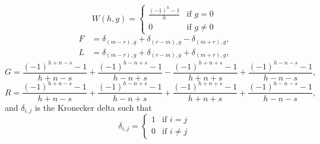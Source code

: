 \begin{equation*}
  W(h,g) = \begin{cases} \frac{\left( -1 \right)^h -1}{h} &\text{if } g = 0 \\
    0& \text{if } g\ne 0
  \end{cases}
\end{equation*}
\begin{align*}
  F &= \delta_{(m-r),g} + \delta_{(r-m),g} - \delta_{(m+r),g}, \\
  L &= \delta_{(m-r),g} + \delta_{(r-m),g} + \delta_{(m+r),g},
\end{align*}
\begin{equation*}
  G = \frac{\left( -1 \right)^{h+n-s}-1}{h+n-s} 
    + \frac{\left( -1 \right)^{h-n+s}-1}{h-n+s}
    - \frac{\left( -1 \right)^{h+n+s}-1}{h+n+s}
    + \frac{\left( -1 \right)^{h-n-s}-1}{h-n-s},
\end{equation*}
\begin{equation*}
  R = \frac{\left( -1 \right)^{h+n-s}-1}{h+n-s} 
    + \frac{\left( -1 \right)^{h-n+s}-1}{h-n+s}
    + \frac{\left( -1 \right)^{h+n+s}-1}{h+n+s}
    + \frac{\left( -1 \right)^{h-n-s}-1}{h-n-s},
\end{equation*}
and $\delta_{i,j}$ is the Kronecker delta such that
\begin{equation*}
  \delta_{i,j} = \begin{cases} 1 & \text{if } i=j \\
    0 & \text{if } i\ne j
  \end{cases}
\end{equation*}

